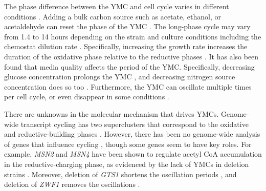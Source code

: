
The phase difference between the YMC and cell cycle varies in different conditions \citep{ewald_yeast_2016}. %
Adding a bulk carbon source such as acetate, ethanol, or acetaldehyde can reset the phase of the YMC \citep{kuang_msn2/4_2017, krishna_minimal_2018}.
The long-phase cycle may vary from 1.4 to 14 hours depending on the strain and culture conditions including the chemostat dilution rate \citep{causton_metabolic_2018}.
Specifically, increasing the growth rate increases the duration of the oxidative phase relative to the reductive phases \citep{slavov_coupling_2011}.
It has also been found that media quality affects the period of the YMC.
Specifically, decreasing glucose concentration prolongs the YMC \citep{mellor_molecular_2016,papagiannakis_autonomous_2017}, and decreasing nitrogen source concentration does so too \citep{baumgartner_flavin-based_2018}.
Furthermore, the YMC can oscillate multiple times per cell cycle, or even disappear in some conditions \citep{baumgartner_flavin-based_2018}. %


There are unknowns in the molecular mechanism that drives YMCs.
Genome-wide transcript cycling has two superclusters that correspond to the oxidative and reductive-building phases \citep{machne_yin_2012}.
However, there has been no genome-wide analysis of genes that influence cycling \citep{mellor_molecular_2016}, though some genes seem to have key roles.
For example, \emph{MSN2} and \emph{MSN4} have been shown to regulate acetyl CoA accumulation in the reductive-charging phase, as evidenced by the lack of YMCs in deletion strains \citep{kuang_msn2/4_2017}.
Moreover, deletion of \emph{GTS1} shortens the oscillation periods \citep{lloyd_ultradian_2005}, and deletion of \emph{ZWF1} removes the oscillations \citep{tu_cyclic_2007}.

